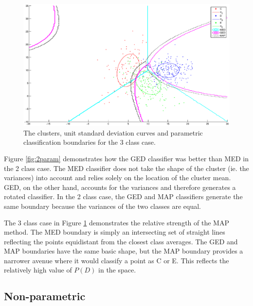 \begin{figure}
  \begin{center}
  	\label{fig:3param}
    \caption{The clusters, unit standard deviation curves and
    parametric classification boundaries for the 3 class case.}
    \includegraphics[width=15cm]{figures/3-param}
  \end{center}
\end{figure}

Figure \ref{fig:2param} demonstrates how the GED classifier 
was better than MED in the 2 class case.  The MED classifier
does not take the shape of the cluster (ie. the variances) into account and
relies solely on the location of the cluster mean. GED, on the
other hand, accounts for the variances and therefore generates a rotated
classifier. In the 2 class case, the GED and MAP classifiers generate the same
boundary because the variances of the two classes are equal.

The 3 class case in Figure \ref{fig:3param} demonstrates the relative strength
of the MAP method. The MED boundary is simply an intersecting set of straight
lines reflecting the points equidistant from the closest class averages. The
GED and MAP boundaries have the same basic shape, but the MAP boundary provides
a narrower avenue where it would classify a point as C or E. This reflects the
relatively high value of $P(D)$ in the space.

\subsection{Non-parametric}


